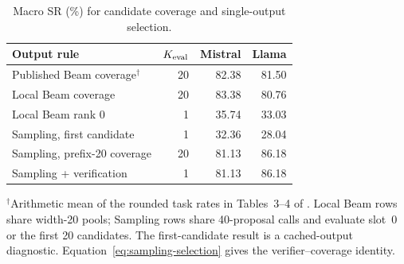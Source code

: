 \begin{table}[t]
\centering\EvalTableFont
\setlength{\tabcolsep}{2.5pt}\renewcommand{\arraystretch}{1.08}
\caption{Macro SR (\%) for candidate coverage and single-output selection.}
\label{tab:readout_diagnostics}
\begin{tabular*}{\linewidth}{@{\extracolsep{\fill}}lrrr@{}}
\toprule
Output rule & $K_{\rm eval}$ & Mistral & Llama \\
\midrule
Published Beam coverage$^{\dagger}$ & 20 & 82.38 & 81.50 \\
Local Beam coverage & 20 & 83.38 & 80.76 \\
Local Beam rank 0 & 1 & 35.74 & 33.03 \\
\midrule
Sampling, first candidate & 1 & 32.36 & 28.04 \\
Sampling, prefix-20 coverage & 20 & 81.13 & 86.18 \\
Sampling + verification & 1 & 81.13 & 86.18 \\
\bottomrule\end{tabular*}
\par\vspace{3pt}\noindent\begin{minipage}{\linewidth}\TableNoteFont
$^{\dagger}$Arithmetic mean of the rounded task rates in Tables~3--4 of \citet{gellmo2025}. Local Beam rows share width-20 pools; Sampling rows share 40-proposal calls and evaluate slot~0 or the first 20 candidates. The first-candidate result is a cached-output diagnostic. Equation~\ref{eq:sampling-selection} gives the verifier--coverage identity.
\end{minipage}
\end{table}
